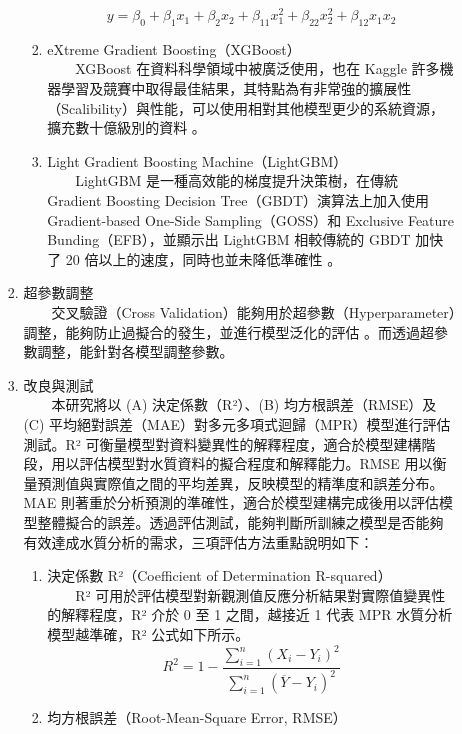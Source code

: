 \documentclass[12pt,a4paper]{article}
\begin{document}
\begin{enumerate}
\begin{enumerate}[label=\arabic*.]
\begin{enumerate}[label=2-2-\arabic*.]
\begin{enumerate}[label=\Alph*.]
\begin{equation}
                        y = \beta_0 + \beta_1 x_1 + \beta_2 x_2 + \beta_{11} x_1^2 + \beta_{22} x_2^2 + \beta_{12} x_1 x_2
                    \end{equation}
                \item eXtreme Gradient Boosting（XGBoost）\\
                　　XGBoost 在資料科學領域中被廣泛使用，也在 Kaggle 許多機器學習及競賽中取得最佳結果，其特點為有非常強的擴展性（Scalibility）與性能，可以使用相對其他模型更少的系統資源，擴充數十億級別的資料 \cite{ref9}。
                \item Light Gradient Boosting Machine（LightGBM）\\
                　　LightGBM 是一種高效能的梯度提升決策樹，在傳統 Gradient Boosting Decision Tree（GBDT）演算法上加入使用 Gradient-based One-Side Sampling（GOSS）和 Exclusive Feature Bunding（EFB），並顯示出 LightGBM 相較傳統的 GBDT 加快了 20 倍以上的速度，同時也並未降低準確性 \cite{ref10}。
            \end{enumerate}
        \item 超參數調整\\
        　　交叉驗證（Cross Validation）能夠用於超參數（Hyperparameter）調整，能夠防止過擬合的發生，並進行模型泛化的評估 \cite{ref34}。而透過超參數調整，能針對各模型調整參數。
        \item 改良與測試\\
        　　本研究將以 (A) 決定係數（R²）、(B) 均方根誤差（RMSE）及 (C) 平均絕對誤差（MAE）對多元多項式迴歸（MPR）模型進行評估測試。R² 可衡量模型對資料變異性的解釋程度，適合於模型建構階段，用以評估模型對水質資料的擬合程度和解釋能力。RMSE 用以衡量預測值與實際值之間的平均差異，反映模型的精準度和誤差分布。MAE 則著重於分析預測的準確性，適合於模型建構完成後用以評估模型整體擬合的誤差。透過評估測試，能夠判斷所訓練之模型是否能夠有效達成水質分析的需求，三項評估方法重點說明如下：
            \begin{enumerate}[label=\Alph*.]
                \item 決定係數 R²（Coefficient of Determination R-squared）\\
                　　R² 可用於評估模型對新觀測值反應分析結果對實際值變異性的解釋程度，R² 介於 0 至 1 之間，越接近 1 代表 MPR 水質分析模型越準確，R² 公式如下所示。
                    \begin{equation}
                    R^2 = 1 - \frac{\sum_{i=1}^n (X_i - Y_i)^2}{\sum_{i=1}^n (\overline{Y} - Y_i)^2}
                    \end{equation}
                \item 均方根誤差（Root-Mean-Square Error, RMSE）\\

\end{enumerate}
\end{enumerate}
\end{enumerate}
\end{enumerate}
\end{document}
